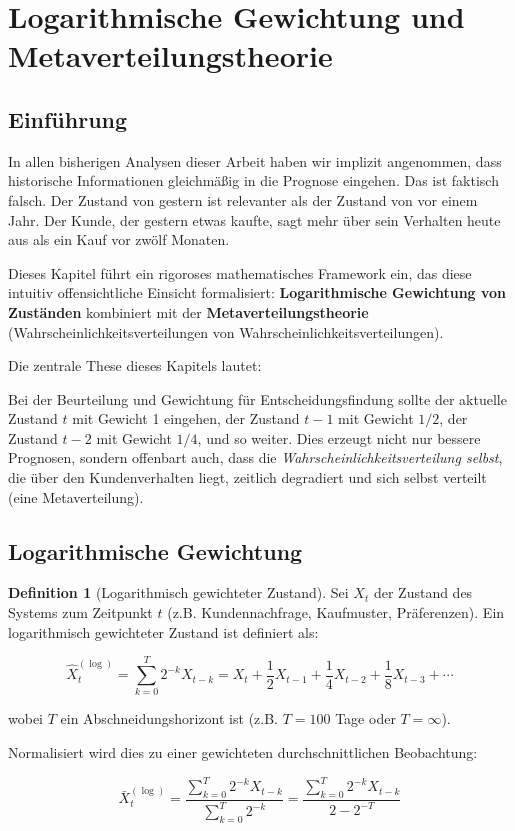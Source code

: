 \documentclass[a4paper, 12pt, twoside, openright]{report}
\theoremstyle{definition}
\newtheorem{definition}[theorem]{Definition}
\theoremstyle{definition}
\begin{document}
\section{Logarithmische Gewichtung und Metaverteilungstheorie}
\label{sec:logarithmic_weighting}

\subsection{Einführung}

In allen bisherigen Analysen dieser Arbeit haben wir implizit angenommen, dass historische Informationen gleichmäßig in die Prognose eingehen. Das ist faktisch falsch. Der Zustand von gestern ist relevanter als der Zustand von vor einem Jahr. Der Kunde, der gestern etwas kaufte, sagt mehr über sein Verhalten heute aus als ein Kauf vor zwölf Monaten.

Dieses Kapitel führt ein rigoroses mathematisches Framework ein, das diese intuitiv offensichtliche Einsicht formalisiert: \textbf{Logarithmische Gewichtung von Zuständen} kombiniert mit der \textbf{Metaverteilungstheorie} (Wahrscheinlichkeitsverteilungen von Wahrscheinlichkeitsverteilungen).

Die zentrale These dieses Kapitels lautet:

Bei der Beurteilung und Gewichtung für Entscheidungsfindung sollte der aktuelle Zustand $t$ mit Gewicht 1 eingehen, der Zustand $t-1$ mit Gewicht $1/2$, der Zustand $t-2$ mit Gewicht $1/4$, und so weiter. Dies erzeugt nicht nur bessere Prognosen, sondern offenbart auch, dass die \emph{Wahrscheinlichkeitsverteilung selbst}, die über den Kundenverhalten liegt, zeitlich degradiert und sich selbst verteilt (eine Metaverteilung).

\subsection{Logarithmische Gewichtung}

\begin{definition}[Logarithmisch gewichteter Zustand]
Sei $X_t$ der Zustand des Systems zum Zeitpunkt $t$ (z.B. Kundennachfrage, Kaufmuster, Präferenzen). Ein logarithmisch gewichteter Zustand ist definiert als:

\begin{equation}
\hat{X}_t^{(\log)} = \sum_{k=0}^{T} 2^{-k} X_{t-k} = X_t + \frac{1}{2} X_{t-1} + \frac{1}{4} X_{t-2} + \frac{1}{8} X_{t-3} + \cdots
\label{eq:log_weighted_state}
\end{equation}

wobei $T$ ein Abschneidungshorizont ist (z.B. $T = 100$ Tage oder $T = \infty$).

Normalisiert wird dies zu einer gewichteten durchschnittlichen Beobachtung:

\begin{equation}
\bar{X}_t^{(\log)} = \frac{\sum_{k=0}^{T} 2^{-k} X_{t-k}}{\sum_{k=0}^{T} 2^{-k}} = \frac{\sum_{k=0}^{T} 2^{-k} X_{t-k}}{2 - 2^{-T}}
\label{eq:normalized_log_weighted}
\end{equation}
\end{definition}
\end{document}
